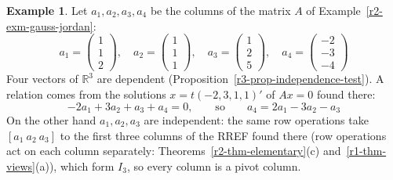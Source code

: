 \documentclass[12pt]{article}
\newcommand{\R}{\mathbb R}
\theoremstyle{definition}
\newtheorem{example}[theorem]{Example}
\begin{document}
\begin{example}\label{r3-exm-dependent}
Let \(a_1,a_2,a_3,a_4\) be the columns of the matrix \(A\) of Example~\ref{r2-exm-gauss-jordan}:
\[
a_1=\begin{pmatrix}1\\1\\2\end{pmatrix},\quad a_2=\begin{pmatrix}1\\1\\1\end{pmatrix},\quad
a_3=\begin{pmatrix}1\\2\\5\end{pmatrix},\quad a_4=\begin{pmatrix}-2\\-3\\-4\end{pmatrix}
\]
Four vectors of \(\R^3\) are dependent (Proposition~\ref{r3-prop-independence-test}). A relation
comes from the solutions \(x=t(-2,3,1,1)'\) of \(Ax=0\) found there:
\[
-2a_1+3a_2+a_3+a_4=0,\qquad\text{so}\qquad a_4=2a_1-3a_2-a_3
\]
On the other hand \(a_1,a_2,a_3\) are independent: the same row operations take
\([a_1\ a_2\ a_3]\) to the first three columns of the RREF found there (row operations act on each column separately:
Theorems~\ref{r2-thm-elementary}(c) and~\ref{r1-thm-views}(a)), which form \(I_3\), so
every column is a pivot column.
\end{example}
\end{document}
